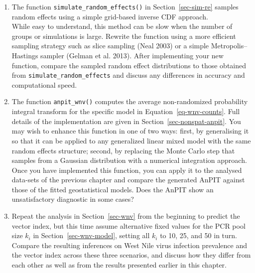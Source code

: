 \documentclass[
  letterpaper,
]{krantz}
\providecommand{\tightlist}{%
  \setlength{\itemsep}{0pt}\setlength{\parskip}{0pt}}
\begin{document}
\begin{enumerate}
\begin{itemize}
    \begin{itemize}
    \tightlist
    \item
      A model using the environmental covariates as separate fixed
      effects.
    \item
      A model using the first principal component (PC1) as a synthetic
      covariate summarizing the covariate space.
    \end{itemize}
  \item
    Evaluate model performance using the AnPIT plot and CRPS/SCRPS
    scores.
  \item
    Reflect on which model performs better in this new setting. Do your
    conclusions align with what was observed in the Malawi case study?
    What might explain any differences in performance across countries?
  \end{itemize}
\item
  The function \texttt{simulate\_random\_effects()} in
  Section~\ref{sec-sim-re} samples random effects using a simple
  grid-based inverse CDF approach.\\
  While easy to understand, this method can be slow when the number of
  groups or simulations is large. Rewrite the function using a more
  efficient sampling strategy such as slice sampling (Neal 2003) or a
  simple Metropolis--Hastings sampler (Gelman et al. 2013). After
  implementing your new function, compare the sampled random effect
  distributions to those obtained from
  \texttt{simulate\_random\_effects} and discuss any differences in
  accuracy and computational speed.
\item
  The function \texttt{anpit\_wnv()} computes the average non-randomized
  probability integral transform for the specific model in
  Equation~\ref{eq-wnv-counts}. Full details of the implementation are
  given in Section~\ref{sec-nonspat-anpit}. You may wish to enhance this
  function in one of two ways: first, by generalising it so that it can
  be applied to any generalized linear mixed model with the same random
  effects structure; second, by replacing the Monte Carlo step that
  samples from a Gaussian distribution with a numerical integration
  approach. Once you have implemented this function, you can apply it to
  the analysed data-sets of the previous chapter and compare the
  generated AnPIT against those of the fitted geostatistical models.
  Does the AnPIT show an unsatisfactory diagnostic in some cases?
\item
  Repeat the analysis in Section~\ref{sec-wnv} from the beginning to
  predict the vector index, but this time assume alternative fixed
  values for the PCR pool size \(k_i\) in Section~\ref{sec-wnv-model},
  setting all \(k_i\) to 10, 25, and 50 in turn. Compare the resulting
  inferences on West Nile virus infection prevalence and the vector
  index across these three scenarios, and discuss how they differ from
  each other as well as from the results presented earlier in this
  chapter.
\end{enumerate}
\end{document}
